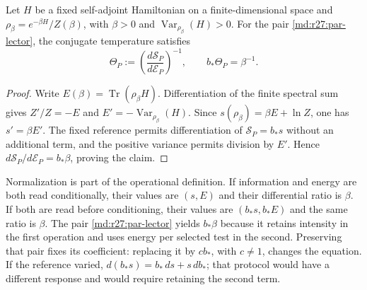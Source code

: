 \begin{theorem}
Let $H$ be a fixed self-adjoint Hamiltonian on a finite-dimensional space and
$\rho_\beta=e^{-\beta H}/Z(\beta)$, with $\beta>0$ and
$\operatorname{Var}_{\rho_\beta}(H)>0$. For the pair
\eqref{md:r27:par-lector}, the conjugate temperature satisfies
\begin{equation}
 \Theta_P:=\left(\frac{d\mathcal S_P}{d\mathcal E_P}\right)^{-1},
 \qquad b_*\Theta_P=\beta^{-1}.
 \label{md:r27:transductor}
\end{equation}
\end{theorem}
\begin{proof}
Write $E(\beta)=\operatorname{Tr}(\rho_\beta H)$.
Differentiation of the finite spectral sum gives
$Z'/Z=-E$ and $E'=-\operatorname{Var}_{\rho_\beta}(H)$.
Since $s(\rho_\beta)=\beta E+\ln Z$, one has $s'=\beta E'$.
The fixed reference permits differentiation of $\mathcal S_P=b_*s$
without an additional term, and the positive variance permits division by
$E'$. Hence $d\mathcal S_P/d\mathcal E_P=b_*\beta$, proving the claim.
\end{proof}

Normalization is part of the operational definition. If information and
energy are both read conditionally, their values are $(s,E)$ and their
differential ratio is $\beta$. If both are read before conditioning, their
values are $(b_*s,b_*E)$ and the same ratio is $\beta$. The pair
\eqref{md:r27:par-lector} yields $b_*\beta$ because it retains intensity in
the first operation and uses energy per selected test in the second.
Preserving that pair fixes its coefficient: replacing it by $cb_*$, with
$c\ne1$, changes the equation. If the reference varied,
$d(b_*s)=b_*\,ds+s\,db_*$; that protocol would have a different response
and would require retaining the second term.

